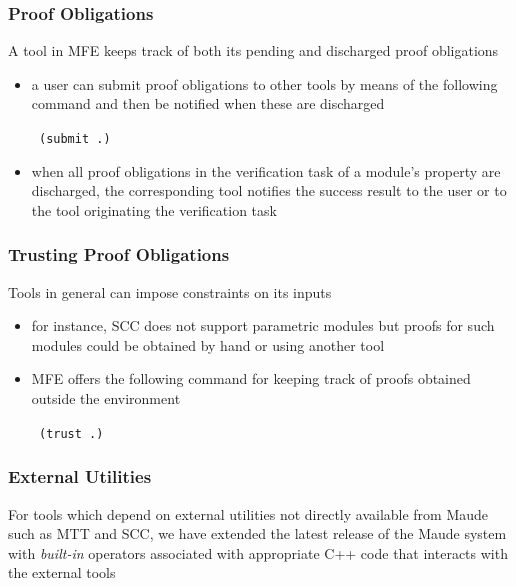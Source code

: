\documentclass{beamer}
\begin{document}
\begin{frame}
  \frametitle{Proof Obligations}

A tool in MFE keeps track of both its pending and discharged proof obligations

\begin{itemize}
  \item<2-> a user can submit proof obligations to other tools by means of the following
    command and then be notified when these are discharged

  \begin{description}
    \item[\texttt{  (submit .)}]
  \end{description}

  \item<3-> when all proof obligations
    in the verification task of a module's property are discharged, 
    the corresponding tool notifies 
    the success result to the user or to the tool originating the verification task

\end{itemize}

\end{frame}


\begin{frame}
  \frametitle{Trusting Proof Obligations}

  Tools in general can impose constraints on its inputs

  \begin{itemize}
    \item<2-> for instance,
      SCC does not support parametric modules but proofs for 
      such modules could be obtained by hand or using another tool

    \item<3-> MFE offers the following command for keeping track of 
      proofs obtained outside the environment

    \begin{description}
      \item[\texttt{  (trust .)}]
    \end{description}
  \end{itemize}
\end{frame}

\begin{frame}
  \frametitle{External Utilities}

  For tools which depend on external
  utilities not directly available from Maude such as MTT and SCC, 
  we have extended the latest release of the Maude system
  with {\em built-in} operators associated with appropriate
  C++ code that interacts with the external tools
\end{frame}
\end{document}
